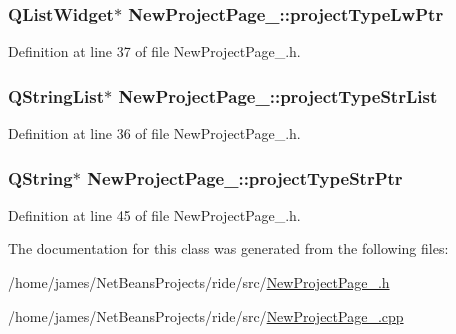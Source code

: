 \hypertarget{class_new_project_page__2_aca414e3a3ca361ef6b24d6f849bc1bca}{
\subsubsection[{project\-Type\-Lw\-Ptr}]{\setlength{\rightskip}{0pt plus 5cm}Q\-List\-Widget$\ast$ New\-Project\-Page\-\_\-::project\-Type\-Lw\-Ptr\hspace{0.3cm}{\ttfamily [private]}}}\label{class_new_project_page__2_aca414e3a3ca361ef6b24d6f849bc1bca}


Definition at line 37 of file New\-Project\-Page\-\_.\-h.

\hypertarget{class_new_project_page__2_a1206183c60275d0189a9a1ec78d3ad2b}{
\subsubsection[{project\-Type\-Str\-List}]{\setlength{\rightskip}{0pt plus 5cm}Q\-String\-List$\ast$ New\-Project\-Page\-\_\-::project\-Type\-Str\-List\hspace{0.3cm}{\ttfamily [private]}}}\label{class_new_project_page__2_a1206183c60275d0189a9a1ec78d3ad2b}


Definition at line 36 of file New\-Project\-Page\-\_.\-h.

\hypertarget{class_new_project_page__2_a11cf2e27845bca28160711333975f68c}{
\subsubsection[{project\-Type\-Str\-Ptr}]{\setlength{\rightskip}{0pt plus 5cm}Q\-String$\ast$ New\-Project\-Page\-\_\-::project\-Type\-Str\-Ptr\hspace{0.3cm}{\ttfamily [private]}}}\label{class_new_project_page__2_a11cf2e27845bca28160711333975f68c}


Definition at line 45 of file New\-Project\-Page\-\_.\-h.



The documentation for this class was generated from the following files\-:\begin{DoxyCompactItemize}
\item 
/home/james/\-Net\-Beans\-Projects/ride/src/\hyperlink{_new_project_page__2_8h}{New\-Project\-Page\-\_.\-h}\item 
/home/james/\-Net\-Beans\-Projects/ride/src/\hyperlink{_new_project_page__2_8cpp}{New\-Project\-Page\-\_.\-cpp}\end{DoxyCompactItemize}
